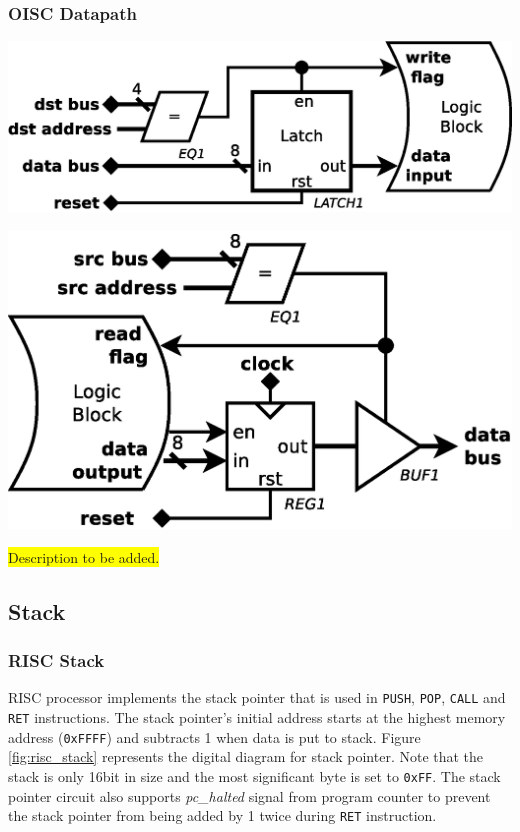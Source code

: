 \subsubsection{OISC Datapath} \label{subsec:oisc_cells}

\begin{colfigure}
	\centering
	\includegraphics[width=\linewidth]{../resources/oisc_cell_in.eps}
	\label{fig:oisc_cell_in}
\end{colfigure}

\begin{colfigure}
	\centering
	\includegraphics[width=\linewidth]{../resources/oisc_cell_out.eps}
	\label{fig:oisc_cell_out}
\end{colfigure}

\colorbox{yellow}{Description to be added.}

\subsection{Stack} \label{subsec:stack}

\subsubsection{RISC Stack}
RISC processor implements the stack pointer that is used in \texttt{PUSH}, \texttt{POP}, \texttt{CALL} and \texttt{RET} instructions. The stack pointer's initial address starts at the highest memory address (\texttt{0xFFFF}) and subtracts 1 when data is put to stack. Figure \ref{fig:risc_stack} represents the digital diagram for stack pointer. Note that the stack is only 16bit in size and the most significant byte is set to \texttt{0xFF}. The stack pointer circuit also supports \textit{pc\_halted} signal from program counter to prevent the stack pointer from being added by 1 twice during \texttt{RET} instruction. 

